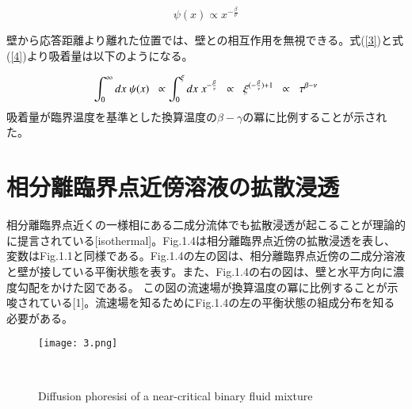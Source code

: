 \documentclass[a4paper,12pt, oneside, openany]{jsbook}
\begin{document}
\begin{equation}\label{4}
\psi(x)\propto x^{-\frac{\beta}{\nu}}
\end{equation}


\noindent 壁から応答距離より離れた位置では、壁との相互作用を無視できる。式(\ref{3})と式(\ref{4})より吸着量は以下のようになる。

\begin{equation}\label{5}
\int_{0}^{\infty}dx \hspace{1mm}\psi(x) \hspace{2mm} \propto  \int_{0}^{\xi} dx \hspace{1mm} x^{-\frac{\beta}{\nu}}  \hspace{2mm} \propto  \hspace{2mm}\xi^{(-\frac{\beta}{\nu})+1} \hspace{2mm} \propto \hspace{2mm}\tau^{\beta-\nu}
\end{equation}
\noindent
吸着量が臨界温度を基準とした換算温度の$\beta-\gamma$の冪に比例することが示された。

\section{相分離臨界点近傍溶液の拡散浸透}
相分離臨界点近くの一様相にある二成分流体でも拡散浸透が起こることが理論的に提言されている[isothermal]。Fig.1.4は相分離臨界点近傍の拡散浸透を表し、変数はFig.1.1と同様である。Fig.1.4の左の図は、相分離臨界点近傍の二成分溶液と壁が接している平衡状態を表す。また、Fig.1.4の右の図は、壁と水平方向に濃度勾配をかけた図である。
この図の流速場が換算温度の冪に比例することが示唆されている[1]。流速場を知るためにFig.1.4の左の平衡状態の組成分布を知る必要がある。
\begin{figure}[!htbp]
\label{Fig.2}
\texttt{[image: 3.png]}
\vspace*{-0.4cm}
\centering  %
\begin{spacing}{0.8}　%
\caption{Diffusion phoresisi of a near-critical binary fluid mixture}
\end{spacing}
\end{figure}

\end{document}
